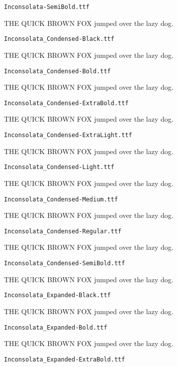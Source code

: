 \documentclass{article}
\begin{document}
\setmainfont[Extension=.ttf]{Inconsolata-SemiBold}
\noindent \verb!Inconsolata-SemiBold.ttf!

THE QUICK BROWN FOX jumped over the lazy dog.

\setmainfont[Extension=.ttf]{Inconsolata_Condensed-Black}
\noindent \verb!Inconsolata_Condensed-Black.ttf!

THE QUICK BROWN FOX jumped over the lazy dog.

\setmainfont[Extension=.ttf]{Inconsolata_Condensed-Bold}
\noindent \verb!Inconsolata_Condensed-Bold.ttf!

THE QUICK BROWN FOX jumped over the lazy dog.

\setmainfont[Extension=.ttf]{Inconsolata_Condensed-ExtraBold}
\noindent \verb!Inconsolata_Condensed-ExtraBold.ttf!

THE QUICK BROWN FOX jumped over the lazy dog.

\setmainfont[Extension=.ttf]{Inconsolata_Condensed-ExtraLight}
\noindent \verb!Inconsolata_Condensed-ExtraLight.ttf!

THE QUICK BROWN FOX jumped over the lazy dog.

\setmainfont[Extension=.ttf]{Inconsolata_Condensed-Light}
\noindent \verb!Inconsolata_Condensed-Light.ttf!

THE QUICK BROWN FOX jumped over the lazy dog.

\setmainfont[Extension=.ttf]{Inconsolata_Condensed-Medium}
\noindent \verb!Inconsolata_Condensed-Medium.ttf!

THE QUICK BROWN FOX jumped over the lazy dog.

\setmainfont[Extension=.ttf]{Inconsolata_Condensed-Regular}
\noindent \verb!Inconsolata_Condensed-Regular.ttf!

THE QUICK BROWN FOX jumped over the lazy dog.

\setmainfont[Extension=.ttf]{Inconsolata_Condensed-SemiBold}
\noindent \verb!Inconsolata_Condensed-SemiBold.ttf!

THE QUICK BROWN FOX jumped over the lazy dog.

\setmainfont[Extension=.ttf]{Inconsolata_Expanded-Black}
\noindent \verb!Inconsolata_Expanded-Black.ttf!

THE QUICK BROWN FOX jumped over the lazy dog.

\setmainfont[Extension=.ttf]{Inconsolata_Expanded-Bold}
\noindent \verb!Inconsolata_Expanded-Bold.ttf!

THE QUICK BROWN FOX jumped over the lazy dog.

\setmainfont[Extension=.ttf]{Inconsolata_Expanded-ExtraBold}
\noindent \verb!Inconsolata_Expanded-ExtraBold.ttf!
\end{document}
